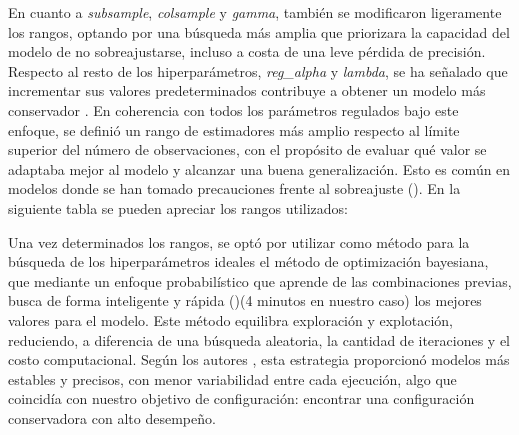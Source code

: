 En cuanto a \textit{subsample}, \textit{colsample} y \textit{gamma}, tambi\'en se modificaron ligeramente los rangos, optando por una b\'usqueda m\'as amplia que priorizara la capacidad del modelo de no sobreajustarse, incluso a costa de una leve p\'erdida de precisi\'on. Respecto al resto de los hiperpar\'ametros, \textit{reg\_alpha} y \textit{lambda}, se ha se\~nalado que incrementar sus valores predeterminados contribuye a obtener un modelo m\'as conservador . En coherencia con todos los par\'ametros regulados bajo este enfoque, se defini\'o un rango de estimadores m\'as amplio respecto al l\'imite superior del n\'umero de observaciones, con el prop\'osito de evaluar qu\'e valor se adaptaba mejor al modelo y alcanzar una buena generalizaci\'on. Esto es com\'un en modelos donde se han tomado precauciones frente al sobreajuste (\cite{boehmke2020homl}). En la siguiente tabla se pueden apreciar los rangos utilizados:

\begin{table}[H]
\centering
\caption{Rangos definidos para los hiperparámetros del modelo XGBoost.}
\label{tab:rangos_xgb_horizontal}
\end{table}

Una vez determinados los rangos, se opt\'o por utilizar como m\'etodo para la b\'usqueda de los hiperpar\'ametros ideales el m\'etodo de optimizaci\'on bayesiana, que mediante un enfoque probabil\'istico que aprende de las combinaciones previas, busca de forma inteligente y r\'apida (\cite{datascientest_bayesiana})(4 minutos en nuestro caso) los mejores valores para el modelo. Este m\'etodo equilibra exploraci\'on y explotaci\'on, reduciendo, a diferencia de una b\'usqueda aleatoria, la cantidad de iteraciones y el costo computacional. Seg\'un los autores \cite{wang2019xgboost}, esta estrategia proporcion\'o modelos m\'as estables y precisos, con menor variabilidad entre cada ejecuci\'on, algo que coincid\'ia con nuestro objetivo de configuraci\'on: encontrar una configuraci\'on conservadora con alto desempe\~no.

